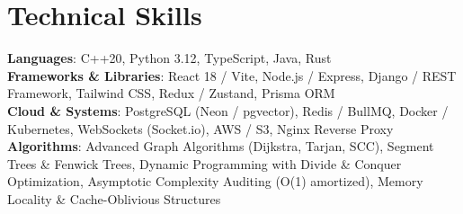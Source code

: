 \documentclass[letterpaper,10pt]{article}
\begin{document}
\section{Technical Skills}
\begin{itemize}[leftmargin=0.15in, label={}]
  \small{\item{
    \textbf{Languages}{: C++20, Python 3.12, TypeScript, Java, Rust} \\
    \textbf{Frameworks \& Libraries}{: React 18 / Vite, Node.js / Express, Django / REST Framework, Tailwind CSS, Redux / Zustand, Prisma ORM} \\
    \textbf{Cloud \& Systems}{: PostgreSQL (Neon / pgvector), Redis / BullMQ, Docker / Kubernetes, WebSockets (Socket.io), AWS / S3, Nginx Reverse Proxy} \\
    \textbf{Algorithms}{: Advanced Graph Algorithms (Dijkstra, Tarjan, SCC), Segment Trees \& Fenwick Trees, Dynamic Programming with Divide \& Conquer Optimization, Asymptotic Complexity Auditing (O(1) amortized), Memory Locality \& Cache-Oblivious Structures}
  }}
\end{itemize}

\end{document}
